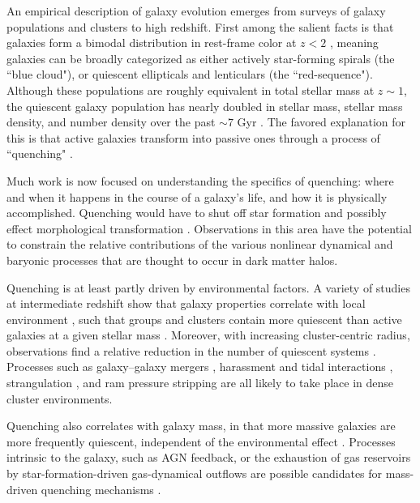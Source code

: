 An empirical description of galaxy evolution emerges from surveys of galaxy populations and clusters to high redshift.
First among the salient facts is that galaxies form a bimodal distribution in rest-frame color at $z < 2$ \citep{Strateva:2001aa,Baldry:2004aa,Bell:2004aa,Williams:2009tt}, meaning galaxies can be broadly categorized as either actively star-forming spirals (the ``blue cloud"), or quiescent ellipticals and lenticulars (the ``red-sequence").
Although these populations are roughly equivalent in total stellar mass at $z\sim1$, the quiescent galaxy population has nearly doubled in stellar mass, stellar mass density, and number density over the past $\sim7$ Gyr \citep{Arnouts:2007aa,Bell:2004aa,Borch:2006aa,Bundy:2006aa,Brown:2007aa,Faber:2007aa}.
The favored explanation for this is that active galaxies transform into passive ones through a process of ``quenching" \citep{Blanton:2006aa,Bundy:2006aa,Faber:2007aa,Brammer:2011aa}.

Much work is now focused on understanding the specifics of quenching: where and when it happens in the course of a galaxy's life, and how it is physically accomplished.
Quenching would have to shut off star formation and possibly effect morphological transformation \citep{Dressler:1980aa}.
Observations in this area have the potential to constrain the relative contributions of the various nonlinear dynamical and baryonic processes that are thought to occur in dark matter halos.

Quenching is at least partly driven by environmental factors.
A variety of studies at intermediate redshift show that galaxy properties correlate with local environment \citep{Cooper:2006aa,Cooper:2007aa,Quadri:2007aa,Patel:2009aa}, such that groups and clusters contain more quiescent than active galaxies at a given stellar mass \citep{George:2011aa,Muzzin:2012dw,Presotto:2012aa,Tanaka:2012aa,Nantais:2017aa}.
Moreover, with increasing cluster-centric radius, observations find a relative reduction in the number of quiescent systems \cite[e.g.][]{Presotto:2012aa}.
Processes such as galaxy–galaxy mergers \citep{Lavery:1988aa}, harassment and tidal interactions \citep{Moore:1998aa,Bekki:2011aa}, strangulation \citep{Larson:1980aa}, and ram pressure stripping \citep{Gunn:1972aa} are all likely to take place in dense cluster environments.

Quenching also correlates with galaxy mass, in that more massive galaxies are more frequently quiescent, independent of the environmental effect \citep{Kauffmann:2004aa,Baldry:2006aa,Peng:2010aa}.
Processes intrinsic to the galaxy, such as AGN feedback, or the exhaustion of gas reservoirs by star-formation-driven gas-dynamical outflows are possible candidates for mass-driven quenching mechanisms \citep{McGee:2014aa,Balogh:2016aa}.


